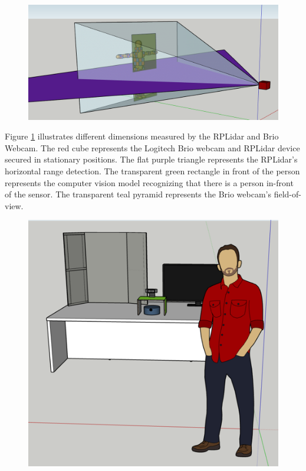 \documentclass[onecolumn, draftclsnofoot,10pt, compsoc]{IEEEtran}
\begin{document}
\begin{singlespace}
			\begin{figure}[here]
				\includegraphics[scale=0.5, width=\textwidth]{different_dimensions.PNG}
				\label{dimensions}
			\end{figure}

			Figure \ref{dimensions} illustrates different dimensions measured by the RPLidar and Brio Webcam.
			The red cube represents the Logitech Brio webcam and RPLidar device secured in stationary positions.
			The flat purple triangle represents the RPLidar's horizontal range detection.
			The transparent green rectangle in front of the person represents the computer vision model recognizing that there is a person in-front of the sensor.
			The transparent teal pyramid represents the Brio webcam's field-of-view.
			
			\begin{figure}[here]
				\includegraphics[scale=0.55]{expo.PNG}
				\label{expo}
			\end{figure}


\end{singlespace}
\end{document}
